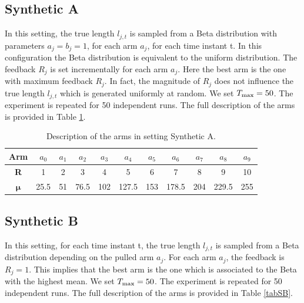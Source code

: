 \subsection{Synthetic A}\label{SA}
In this setting, the true length $l_{j,t}$ is sampled from a Beta distribution with parameters $a_j = b_j = 1$, for each arm $a_j$, for each time instant t. In this configuration the Beta distribution is equivalent to the uniform distribution. The feedback $R_j$ is set incrementally for each arm $a_j$. Here the best arm is the one with maximum feedback $R_j$. In fact, the magnitude of $R_j$ does not influence the true length $l_{j,t}$ which is generated uniformly at random.  We set $T_{\textnormal{max}} = 50$. The experiment is repeated for 50 independent runs. The full description of the arms is provided in Table \ref{tabSA}.



\begin{table}[H]
	
	\centering	
	\caption{Description of the arms in setting Synthetic A.}
	\begin{tabular}{|c|cccccccccc|}
		\hline
		\textbf{Arm}       & $a_0$ & $a_1$ & $a_2$ & $a_3$ & $a_4$ & $a_5$ & $a_6$ & $a_7$ & $a_8$ & $a_9$ \\ \hline
		\textbf{R}         & 1     & 2     & 3     & 4     & 5     & 6     & 7     & 8     & 9     & 10    \\
		$\boldsymbol{\mu}$ & 25.5  & 51    & 76.5  & 102   & 127.5 & 153   & 178.5 & 204   & 229.5 & 255   \\ \hline
	\end{tabular}
	
\label{tabSA}
\end{table}
\subsection{Synthetic B}
In this setting, for each time instant t, the true length $l_{j,t}$ is sampled from a Beta distribution depending on the pulled arm $a_j$. For each arm $a_j$, the feedback is $R_j=1$. This implies that the best arm is the one which is associated to the Beta with the highest mean. We set $T_{\textnormal{max}}=50$. The experiment is repeated for 50 independent runs. The full description of the arms is provided in Table \ref{tabSB}.



